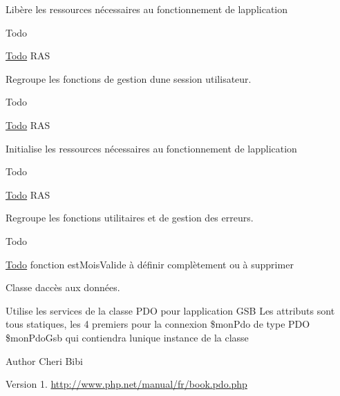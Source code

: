 Libère les ressources nécessaires au fonctionnement de l\textquotesingle{}application

\begin{DoxyRefDesc}{Todo}
\item[\hyperlink{todo__todo000006}{Todo}]R\+A\+S \end{DoxyRefDesc}


Regroupe les fonctions de gestion d\textquotesingle{}une session utilisateur.

\begin{DoxyRefDesc}{Todo}
\item[\hyperlink{todo__todo000007}{Todo}]R\+A\+S \end{DoxyRefDesc}


Initialise les ressources nécessaires au fonctionnement de l\textquotesingle{}application

\begin{DoxyRefDesc}{Todo}
\item[\hyperlink{todo__todo000008}{Todo}]R\+A\+S \end{DoxyRefDesc}


Regroupe les fonctions utilitaires et de gestion des erreurs.

\begin{DoxyRefDesc}{Todo}
\item[\hyperlink{todo__todo000010}{Todo}]fonction est\+Mois\+Valide à définir complètement ou à supprimer \end{DoxyRefDesc}


Classe d\textquotesingle{}accès aux données.

Utilise les services de la classe P\+D\+O pour l\textquotesingle{}application G\+S\+B Les attributs sont tous statiques, les 4 premiers pour la connexion \$mon\+Pdo de type P\+D\+O \$mon\+Pdo\+Gsb qui contiendra l\textquotesingle{}unique instance de la classe

\begin{DoxyAuthor}{Author}
Cheri Bibi 
\end{DoxyAuthor}
\begin{DoxyVersion}{Version}
1. \hyperlink{}{http\+://www.\+php.\+net/manual/fr/book.\+pdo.\+php}
\end{DoxyVersion}
